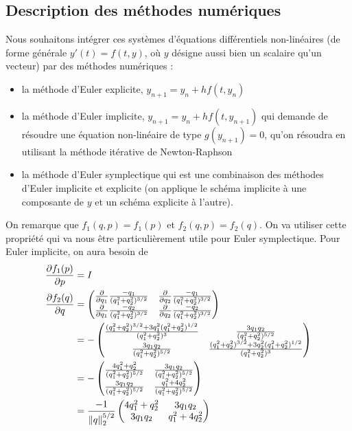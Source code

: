 \subsection{Description des méthodes numériques}
Nous souhaitons intégrer ces systèmes d'équations différentiels non-linéaires (de forme générale $y'(t) = f(t,y)$, où $y$ désigne aussi bien un scalaire qu'un vecteur) par des méthodes numériques : 
\begin{itemize}
\item la méthode d'Euler explicite, $y_{n+1} = y_n + h f(t,y_n)$
\item la méthode d'Euler implicite, $y_{n+1} = y_n + h f(t,y_{n+1})$ qui demande de résoudre une équation non-linéaire de type $g(y_{n+1})=0$, qu'on résoudra en utilisant la méthode itérative de Newton-Raphson
\item la méthode d'Euler symplectique qui est une combinaison des méthodes d'Euler implicite et explicite (on applique le schéma implicite à une composante de $y$ et un schéma explicite à l'autre). 
\end{itemize}

On remarque que $f_1(q,p) = f_1(p)$ et $f_2(q,p) = f_2(q)$.
On va utiliser cette propriété qui va nous être particulièrement utile pour Euler symplectique.
Pour Euler implicite, on aura besoin de
\begin{align*}
  \frac{\partial f_1(p)}{\partial p} & = I\\
  \frac{\partial f_2(q)}{\partial q} & =
  \begin{pmatrix}
    \frac{\partial }{\partial q_1}\frac{-q_1}{(q_1^2 + q_2^2)^{3/2}} &
    \frac{\partial }{\partial q_2}\frac{-q_1}{(q_1^2 + q_2^2)^{3/2}}\\
    \frac{\partial }{\partial q_1}\frac{-q_2}{(q_1^2 + q_2^2)^{3/2}} &
    \frac{\partial }{\partial q_2}\frac{-q_2}{(q_1^2 + q_2^2)^{3/2}}
  \end{pmatrix}\\
  & =
  -\begin{pmatrix}
    \frac{(q_1^2 + q_2^2)^{3/2} + 3q_1^2(q_1^2 + q_2^2)^{1/2}}{(q_1^2 + q_2^2)^3} &
    \frac{3q_1q_2}{(q_1^2 + q_2^2)^{5/2}}\\
    \frac{3q_1q_2}{(q_1^2 + q_2^2)^{5/2}} &
    \frac{(q_1^2 + q_2^2)^{3/2} + 3q_2^2(q_1^2 + q_2^2)^{1/2}}{(q_1^2 + q_2^2)^3}
  \end{pmatrix}\\
  & =
  -\begin{pmatrix}
    \frac{4q_1^2 + q_2^2}{(q_1^2 + q_2^2)^{5/2}} &
    \frac{3q_1q_2}{(q_1^2 + q_2^2)^{5/2}}\\
    \frac{3q_1q_2}{(q_1^2 + q_2^2)^{5/2}} &
    \frac{q_1^2 + 4q_2^2}{(q_1^2 + q_2^2)^{5/2}}
  \end{pmatrix}\\
  & =
  \frac{-1}{\|q\|_2^{5/2}}
  \begin{pmatrix}
    4q_1^2 + q_2^2 &
    3q_1q_2\\
    3q_1q_2 &
    q_1^2 + 4q_2^2
  \end{pmatrix}
\end{align*}

